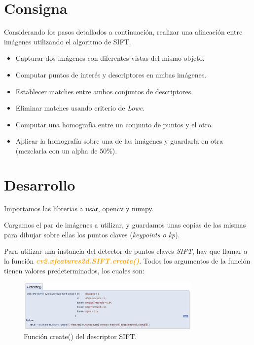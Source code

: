\documentclass[11pt, a4paper]{article}
\begin{document}
	\section{Consigna}
	Considerando los pasos detallados a continuación, realizar una alineación entre imágenes utilizando el algoritmo de SIFT.
	\begin{itemize}\itemsep 0em
		\item Capturar dos imágenes con diferentes vistas del mismo objeto.
		\item Computar puntos de interés y descriptores en ambas imágenes.
		\item Establecer matches entre ambos conjuntos de descriptores.
		\item Eliminar matches usando criterio de \textit{Lowe}.
		\item Computar una homografía entre un conjunto de puntos y el otro.
		\item Aplicar la homografía sobre una de las imágenes y guardarla en otra (mezclarla con un alpha de 50\%).
	\end{itemize}

	\section{Desarrollo}
	Importamos las librerias a usar, opencv y numpy.
	

	Cargamos el par de imágenes a utilizar, y guardamos unas copias de las mismas para dibujar sobre ellas los puntos claves (\textit{keypoints o kp}).
	

	Para utilizar una instancia del detector de puntos claves \textit{SIFT}, hay que llamar a la función \textcolor{orange}{\textbf{\textit{cv2.xfeatures2d.SIFT.create()}}}. Todos los argumentos de la función tienen valores predeterminados, los cuales son:

	\begin{figure}[H]
		\centering
		\includegraphics[width=0.8\textwidth]{Imagenes/sift_fn.png}
		\caption{Función create() del descriptor SIFT.}
		\label{fig:sift_fn}
	\end{figure} 
	
\end{document}
